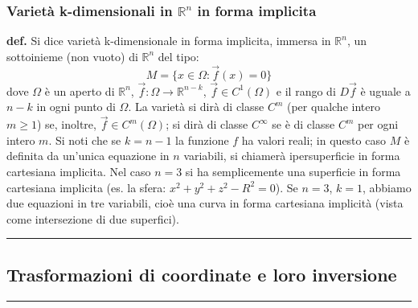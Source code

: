 \subsubsection*{Varietà k-dimensionali in $\mathbb{R}^n$ in forma implicita}
\textbf{def.} Si dice varietà k-dimensionale in forma implicita, immersa in $\mathbb{R}^n$, un sottoinieme (non vuoto) di $\mathbb{R}^n$ del tipo:
\[
    M = \{x \in \Omega : \vec{f}(x) = 0\}
\]
dove $\Omega$ è un aperto di $\mathbb{R}^n$, $\vec{f}: \Omega \rightarrow \mathbb{R}^{n-k}$, $\vec{f} \in C^1(\Omega)$ e il rango di $D \vec{f}$ è uguale a $n-k$ in ogni punto di $\Omega$. La varietà si dirà di classe $C^m$ (per qualche intero $m \geq 1$) se, inoltre, $\vec{f} \in C^m (\Omega)$; si dirà di classe $C^{\infty}$ se è di classe $C^m$ per ogni intero $m$.\newline
\newline
Si noti che se $k = n-1$ la funzione $f$ ha valori reali; in questo caso $M$ è definita da un'unica equazione in $n$ variabili, si chiamerà ipersuperficie in forma cartesiana implicita. Nel caso $n=3$ si ha semplicemente una superficie in forma cartesiana implicita (es. la sfera: $x^2 + y^2 + z^2 - R^2= 0$).\newline
\newline
Se $n=3$, $k=1$, abbiamo due equazioni in tre variabili, cioè una curva in forma cartesiana implicità (vista come intersezione di due superfici).\newline
\rule{\textwidth}{2pt}
\subsection*{Trasformazioni di coordinate e loro inversione}
\rule{\textwidth}{0,4pt}
